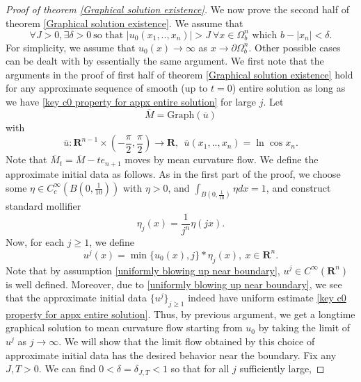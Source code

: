 \documentclass[pdflatex,sn-mathphys-num]{sn-jnl}%
\begin{document}
\begin{proof}[Proof of theorem \ref{Graphical solution existence}]
We now prove the second half of theorem \ref{Graphical solution existence}. We assume that 
\begin{equation}\label{uniformly blowing up near boundary}
    \forall J > 0, \exists\delta > 0 \ \text{so that }|u_0(x_1,..,x_n)| > J \ \forall x \in \Omega^n_b \text{ which }b - |x_n| < \delta.
\end{equation}
For simplicity, we assume that $u_0(x) \to \infty$ as $x \to \partial \Omega^n_b$. Other possible cases can be dealt with by essentially the same argument. We first note that the arguments in the proof of first half of theorem \ref{Graphical solution existence} hold for any approximate sequence of smooth (up to $t = 0$) entire solution as long as we have \eqref{key c0 property for appx entire solution} for large $j$. Let 
\begin{equation}
    \overline{M} = \text{Graph}(\overline{u})
\end{equation}
with
\begin{equation}
    \overline{u} : \mathbf{R}^{n-1}\times (-\frac{\pi}{2}, \frac{\pi}{2}) \to \mathbf{R}, \ \ \overline{u}(x_1,..,x_n) = \ln \cos x_{n}.
\end{equation}
Note that $\overline{M}_t = \overline{M} - te_{n+1}$ moves by mean curvature flow. We define the approximate initial data as follows. As in the first part of the proof, we choose some $\eta \in C^{\infty}_c(B(0, \frac{1}{10}))$ with $\eta > 0$, and $\int_{B(0, \frac{1}{10})}\eta dx = 1$, and construct standard mollifier
\begin{equation}
    \eta_j(x) = \frac{1}{j^n}\eta(jx).
\end{equation}
Now, for each $j \geq 1$, we define
\begin{equation}
    u^j(x) = \min \{u_0(x), j\} * \eta_j(x), \ x\in \mathbf{R}^n.
\end{equation}
Note that by assumption \eqref{uniformly blowing up near boundary}, $u^j \in C^{\infty}(\mathbf{R}^n)$ is well defined. Moreover, due to \eqref{uniformly blowing up near boundary}, we see that the approximate initial data $\{u^j\}_{j \geq 1}$ indeed have uniform estimate \eqref{key c0 property for appx entire solution}. Thus, by previous argument, we get a longtime graphical solution to mean curvature flow starting from $u_0$ by taking the limit of $u^j$ as $j \to \infty$. We will show that the limit flow obtained by this choice of approximate initial data has the desired behavior near the boundary. Fix any $J,T > 0$. We can find $0 < \delta = \delta_{J,T} <1$ so that for all $j$ sufficiently large, 

\end{proof}
\end{document}
